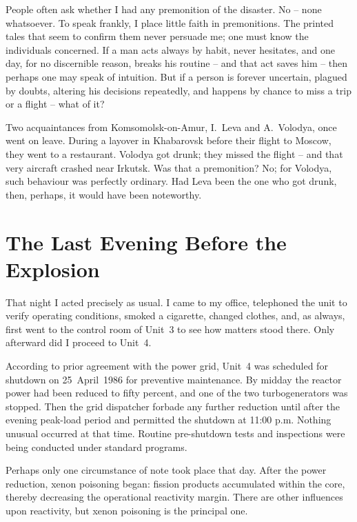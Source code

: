 \documentclass[openright]{bookest}
\begin{document}
People often ask whether I had any premonition of the disaster. No -- none whatsoever. To speak frankly, I place little faith in premonitions. The printed tales that seem to confirm them never persuade me; one must know the individuals concerned. If a man acts always by habit, never hesitates, and one day, for no discernible reason, breaks his routine -- and that act saves him -- then perhaps one may speak of intuition. But if a person is forever uncertain, plagued by doubts, altering his decisions repeatedly, and happens by chance to miss a trip or a flight -- what of it?

Two acquaintances from Komsomolsk-on-Amur, I.~Leva and A.~Volodya, once went on leave. During a layover in Khabarovsk before their flight to Moscow, they went to a restaurant. Volodya got drunk; they missed the flight -- and that very aircraft crashed near Irkutsk. Was that a premonition? No; for Volodya, such behaviour was perfectly ordinary. Had Leva been the one who got drunk, then, perhaps, it would have been noteworthy.

\section{The Last Evening Before the Explosion}

That night I acted precisely as usual. I came to my office, telephoned the unit to verify operating conditions, smoked a cigarette, changed clothes, and, as always, first went to the control room of Unit~3 to see how matters stood there. Only afterward did I proceed to Unit~4.

According to prior agreement with the power grid, Unit~4 was scheduled for shutdown on 25~April~1986 for preventive maintenance. By midday the reactor power had been reduced to fifty percent, and one of the two turbogenerators was stopped. Then the grid dispatcher forbade any further reduction until after the evening peak-load period and permitted the shutdown at 11:00 p.m. Nothing unusual occurred at that time. Routine pre-shutdown tests and inspections were being conducted under standard programs.

Perhaps only one circumstance of note took place that day. After the power reduction, xenon poisoning began: fission products accumulated within the core, thereby decreasing the operational reactivity margin. There are other influences upon reactivity, but xenon poisoning is the principal one.
\end{document}
